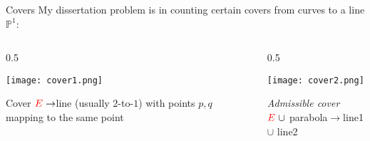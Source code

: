 \documentclass{beamer}
\renewcommand{\P}{\mathbb P}
\theoremstyle{definition}
\begin{document}
                                                                                                                                                                                                                          \begin{frame}{Covers}
        My dissertation problem is in counting certain covers from curves to a line $\P^1$:
                                                                                                                                                                                                                            \begin{columns}[c]
        \begin{column}{0.5\hsize}

          \texttt{[image: cover1.png]}

          Cover ${\color{red}E}\to${\color{blue}line} (usually $2$-to-$1$)
          with points {\color{green!40!black}$p,q$} mapping to the same point

        \end{column}
        \begin{column}{0.5\hsize}

          \texttt{[image: cover2.png]}

          {\it Admissible cover}
          \\ ${\color{red}E}\ \cup$ parabola$\to${\color{blue}line1} $\cup$ {\color{orange}line2}


        \end{column}

      \end{columns}
                                                                                                                                                                                                                          \end{frame}
\end{document}
